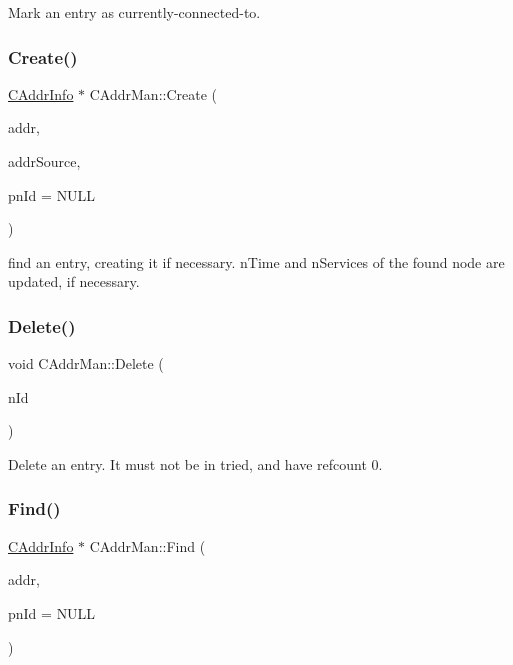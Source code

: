 Mark an entry as currently-\/connected-\/to. 

\mbox{\label{class_c_addr_man_aac93f51c0580e38a950a0f63b053bedb}} 
\subsubsection{\texorpdfstring{Create()}{Create()}}
{\footnotesize\ttfamily \mbox{\hyperlink{class_c_addr_info}{C\+Addr\+Info}} $\ast$ C\+Addr\+Man\+::\+Create (\begin{DoxyParamCaption}\item[{const \mbox{\hyperlink{class_c_address}{C\+Address}} \&}]{addr,  }\item[{const \mbox{\hyperlink{class_c_net_addr}{C\+Net\+Addr}} \&}]{addr\+Source,  }\item[{int $\ast$}]{pn\+Id = {\ttfamily NULL} }\end{DoxyParamCaption})\hspace{0.3cm}{\ttfamily [protected]}}

find an entry, creating it if necessary. n\+Time and n\+Services of the found node are updated, if necessary. \mbox{\label{class_c_addr_man_af488eac123030538770dbc4e3b16eb74}} 
\subsubsection{\texorpdfstring{Delete()}{Delete()}}
{\footnotesize\ttfamily void C\+Addr\+Man\+::\+Delete (\begin{DoxyParamCaption}\item[{int}]{n\+Id }\end{DoxyParamCaption})\hspace{0.3cm}{\ttfamily [protected]}}



Delete an entry. It must not be in tried, and have refcount 0. 

\mbox{\label{class_c_addr_man_ac961ead1a1afde144fc486b6d7c7369d}} 
\subsubsection{\texorpdfstring{Find()}{Find()}}
{\footnotesize\ttfamily \mbox{\hyperlink{class_c_addr_info}{C\+Addr\+Info}} $\ast$ C\+Addr\+Man\+::\+Find (\begin{DoxyParamCaption}\item[{const \mbox{\hyperlink{class_c_net_addr}{C\+Net\+Addr}} \&}]{addr,  }\item[{int $\ast$}]{pn\+Id = {\ttfamily NULL} }\end{DoxyParamCaption})\hspace{0.3cm}{\ttfamily [protected]}}



